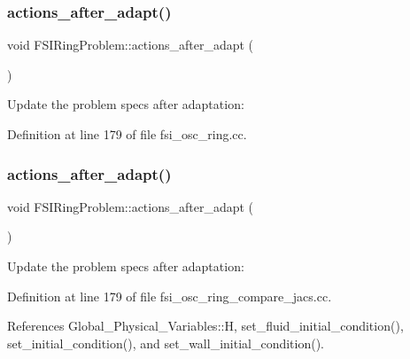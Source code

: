 \subsubsection{\texorpdfstring{actions\+\_\+after\+\_\+adapt()}{actions\_after\_adapt()}\hspace{0.1cm}{\footnotesize\ttfamily [1/2]}}
{\footnotesize\ttfamily void F\+S\+I\+Ring\+Problem\+::actions\+\_\+after\+\_\+adapt (\begin{DoxyParamCaption}{ }\end{DoxyParamCaption})\hspace{0.3cm}{\ttfamily [inline]}}



Update the problem specs after adaptation\+: 



Definition at line 179 of file fsi\+\_\+osc\+\_\+ring.\+cc.

\mbox{\label{classFSIRingProblem_af4ffa3d628230ef064a84b7c6e6a5fb8}} 
\subsubsection{\texorpdfstring{actions\+\_\+after\+\_\+adapt()}{actions\_after\_adapt()}\hspace{0.1cm}{\footnotesize\ttfamily [2/2]}}
{\footnotesize\ttfamily void F\+S\+I\+Ring\+Problem\+::actions\+\_\+after\+\_\+adapt (\begin{DoxyParamCaption}{ }\end{DoxyParamCaption})\hspace{0.3cm}{\ttfamily [inline]}}



Update the problem specs after adaptation\+: 



Definition at line 179 of file fsi\+\_\+osc\+\_\+ring\+\_\+compare\+\_\+jacs.\+cc.



References Global\+\_\+\+Physical\+\_\+\+Variables\+::H, set\+\_\+fluid\+\_\+initial\+\_\+condition(), set\+\_\+initial\+\_\+condition(), and set\+\_\+wall\+\_\+initial\+\_\+condition().

\mbox{\label{classFSIRingProblem_a63a3da079b167ccdc288372bee6bdbc3}} 
